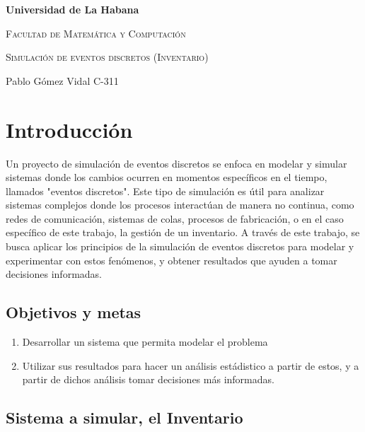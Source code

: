 \documentclass{article}
\begin{document}
\begin{titlepage}
    \centering
    {\bfseries\LARGE Universidad de La Habana \par}
    \vspace{1cm}
    {\scshape\Large Facultad de Matemática y Computación \par}
    \vspace{3cm}
    {\scshape\Huge Simulación de eventos discretos (Inventario) \par}
    \vfill

    {\Large Pablo Gómez Vidal C-311 \par}
    
\end{titlepage}

\section*{Introducción}
Un proyecto de simulación de eventos discretos se enfoca en modelar y simular sistemas donde los cambios ocurren en momentos específicos en el tiempo, llamados "eventos discretos". Este tipo de simulación es útil para analizar sistemas complejos donde los procesos interactúan de manera no continua, como redes de comunicación, sistemas de colas, procesos de fabricación, o en el caso específico de este trabajo, la gestión de un inventario.
A través de este trabajo, se busca aplicar los principios de la simulación de eventos discretos para modelar
y experimentar con estos fenómenos, y obtener resultados que ayuden a tomar decisiones informadas.


\subsection*{Objetivos y metas}
\begin{enumerate}
    \item Desarrollar un sistema que permita modelar el problema
    \item Utilizar sus resultados para hacer un análisis estádistico a partir de estos, y a partir de dichos análisis tomar decisiones más informadas.
\end{enumerate}

\subsection*{Sistema a simular, el Inventario}
\end{document}
